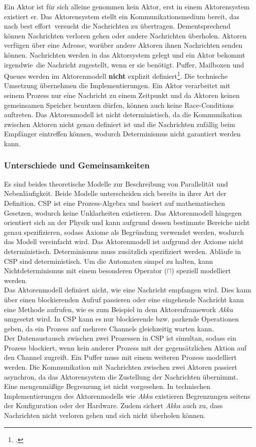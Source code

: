 \documentclass[12pt,a4paper,parskip=half,listof=totoc]{scrreprt}
\begin{document}
Ein Aktor ist für sich alleine genommen kein Aktor, erst in einem Aktorensystem existiert er. Das Aktorensystem stellt ein Kommunikationsmedium bereit, das nach \glqq best effort\grqq\ versucht die Nachrichten zu übertragen. Dementsprechend können Nachrichten verloren gehen oder andere Nachrichten überholen. Aktoren verfügen über eine Adresse, worüber andere Aktoren ihnen Nachrichten senden können. Nachrichten werden in das Aktorsystem gelegt und ein Aktor bekommt \glqq irgendwie\grqq\ die Nachricht zugestellt, wenn er sie benötigt. Puffer, Mailboxen und Queues werden im Aktorenmodell \textbf{nicht} explizit definiert\footcite[Seite 3, Rechte Spalte]{ACTORSNEW}. Die technische Umsetzung übernehmen die Implementierungen. Ein Aktor verarbeitet mit seinem Prozess nur eine Nachricht zu einem Zeitpunkt und da Aktoren keinen gemeinsamen Speicher benutzen dürfen, können auch keine Race-Conditions auftreten. Das Aktorenmodell ist nicht deterministisch, da die Kommunikation zwischen Aktoren nicht genau definiert ist und die Nachrichten zufällig beim Empfänger eintreffen können, wodurch Determinismus nicht garantiert werden kann.

\subsubsection{Unterschiede und Gemeinsamkeiten}
Es sind beides theoretische Modelle zur Beschreibung von Parallelität und Nebenläufigkeit. 
Beide Modelle unterscheiden sich bereits in ihrer Art der Definition. \ac{CSP} ist eine Prozess-Algebra und basiert auf mathematischen Gesetzen, wodurch keine Unklarheiten existieren. Das Aktorenmodell hingegen orientiert sich an der Physik und kann aufgrund dessen bestimmte Bereiche nicht genau spezifizieren, sodass Axiome als Begründung verwendet werden, wodurch das Modell vereinfacht wird. Das Aktorenmodell ist aufgrund der Axiome nicht deterministisch. Determinismus muss zusätzlich spezifiziert werden. Abläufe in \ac{CSP} sind deterministisch. Um die Automaten simpel zu halten, kann Nichtdeterminismus mit einem besonderen Operator ($\sqcap$) speziell modelliert werden.\\
Das Aktorenmodell definiert nicht, wie eine Nachricht empfangen wird. Dies kann über einen blockierenden Aufruf passieren oder eine eingehende Nachricht kann eine Methode aufrufen, wie es zum Beispiel in dem Aktorenframework \textit{Akka} umgesetzt wird. In \ac{CSP} kann es nur blockierende bzw. parkende Operationen geben, da ein Prozess auf mehrere Channels gleichzeitig warten kann.\\
Der Datenaustausch zwischen zwei Prozessen in \ac{CSP} ist simultan, sodass ein Prozess blockiert, wenn kein anderer Prozess mit der gegensätzlichen Aktion auf den Channel zugreift. Ein Puffer muss mit einem weiteren Prozess modelliert werden. Die Kommunikation mit Nachrichten zwischen zwei Aktoren passiert asynchron, da das Aktorensystem die Zustellung der Nachrichten übernimmt. Eine mengenmäßige Begrenzung ist nicht vorgesehen. In technischen Implementierungen des Aktorenmodells wie \textit{Akka} existieren Begrenzungen seitens der Konfiguration oder der Hardware. Zudem sichert \textit{Akka} auch zu, dass Nachrichten nicht verloren gehen und sich nicht überholen können.
\end{document}
